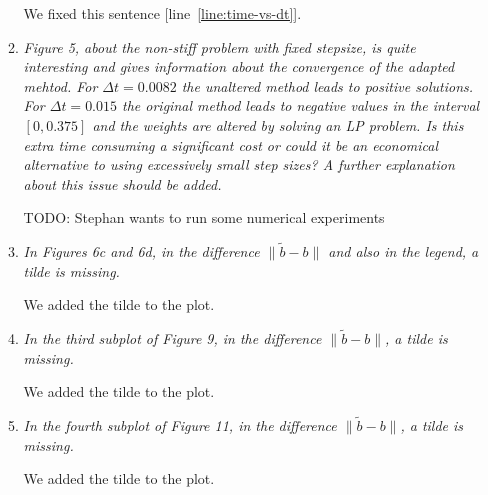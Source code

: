 \documentclass[11pt]{letter}
\newcommand{\revA}[1]{{\color{red}#1}}
\begin{document}
\begin{letter}{}
\begin{enumerate}[label=\arabic*.]
\begin{enumerate}[label=\alph*)]
    We fixed this sentence [line~\ref{line:time-vs-dt}].


    \item \emph{%
    Figure 5, about the non-stiff problem with fixed stepsize, is quite interesting
    and gives information about the convergence of the adapted mehtod. For
    $\Delta t = 0.0082$ the unaltered method leads to positive solutions. For
    $\Delta t = 0.015$ the original method leads to negative values in the
    interval $[0, 0.375]$ and the weights are altered by solving an LP problem.
    Is this extra time consuming a significant cost or could it be an economical
    alternative to using excessively small step sizes? A further explanation
    about this issue should be added.
    }

    \revA{TODO: Stephan wants to run some numerical experiments} %


    \item \emph{%
    In Figures 6c and 6d, in the difference $\| \tilde b - b \|$ and also in the
    legend, a tilde is missing.
    }

    We added the tilde to the plot.


    \item \emph{%
    In the third subplot of Figure 9, in the difference $\| \tilde b - b \|$,
    a tilde is missing.
    }

    We added the tilde to the plot.


    \item \emph{%
    In the fourth subplot of Figure 11, in the difference $\| \tilde b - b \|$,
    a tilde is missing.
    }

    We added the tilde to the plot.
  \end{enumerate}
\end{enumerate}








\end{letter}
\end{document}
